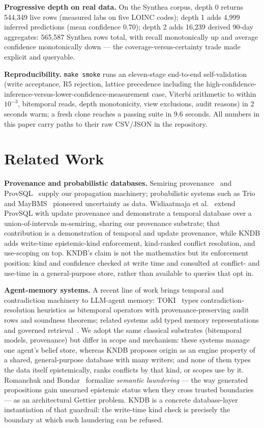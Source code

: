 \documentclass[sigconf,nonacm]{acmart}
\begin{document}
\noindent\textbf{Progressive depth on real data.} On the Synthea corpus, depth 0 returns 544,349 live rows (measured labs on five LOINC codes); depth 1 adds 4,999 inferred predictions (mean confidence 0.70); depth 2 adds 16,239 derived 90-day aggregates: 565,587 Synthea rows total, with recall monotonically up and average confidence monotonically down --- the coverage-versus-certainty trade made explicit and queryable.

\noindent\textbf{Reproducibility.} \texttt{make smoke} runs an eleven-stage end-to-end self-validation (write acceptance, R5 rejection, lattice precedence including the high-confidence-inference-versus-lower-confidence-measurement case, Viterbi arithmetic to within $10^{-3}$, bitemporal reads, depth monotonicity, view exclusions, audit reasons) in 2 seconds warm; a fresh clone reaches a passing suite in 9.6 seconds. All numbers in this paper carry paths to their raw CSV/JSON in the repository.

\section{Related Work}
\noindent\textbf{Provenance and probabilistic databases.} Semiring provenance~\cite{green} and ProvSQL~\cite{provsql} supply our propagation machinery; probabilistic systems such as Trio~\cite{trio} and MayBMS~\cite{maybms} pioneered uncertainty as data. Widiaatmaja et al.~\cite{provsqlupd} extend ProvSQL with update provenance and demonstrate a temporal database over a union-of-intervals m-semiring, sharing our provenance substrate; that contribution is a demonstration of temporal and update provenance, while KNDB adds write-time epistemic-kind enforcement, kind-ranked conflict resolution, and use-scoping on top. KNDB's claim is not the mathematics but its enforcement position: kind and confidence checked at write time and consulted at conflict- and use-time in a general-purpose store, rather than available to queries that opt in.

\noindent\textbf{Agent-memory systems.} A recent line of work brings temporal and contradiction machinery to LLM-agent memory: TOKI~\cite{toki} types contradiction-resolution heuristics as bitemporal operators with provenance-preserving audit rows and soundness theorems; related systems add typed memory representations and governed retrieval~\cite{memir,gsm}. We adopt the same classical substrates (bitemporal models, provenance) but differ in scope and mechanism: these systems manage one agent's belief store, whereas KNDB proposes origin as an engine property of a shared, general-purpose database with many writers; and none of them types the data itself epistemically, ranks conflicts by that kind, or scopes use by it. Romanchuk and Bondar~\cite{semlaunder} formalize \emph{semantic laundering} --- the way generated propositions gain unearned epistemic status when they cross trusted boundaries --- as an architectural Gettier problem. KNDB is a concrete database-layer instantiation of that guardrail: the write-time kind check is precisely the boundary at which such laundering can be refused.
\end{document}
